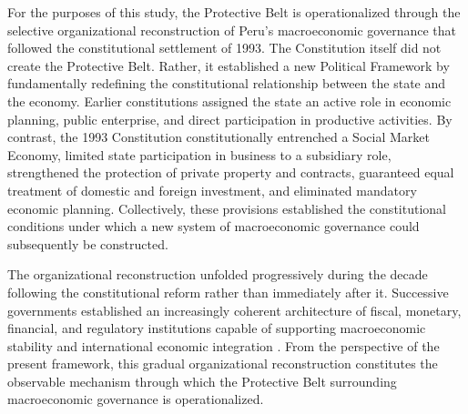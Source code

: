 \documentclass[doc, 12pt, a4paper,floatsintext]{apa7}
\begin{document}
For the purposes of this study, the Protective Belt is operationalized through the selective organizational reconstruction of Peru's macroeconomic governance that followed the constitutional settlement of 1993. The Constitution itself did not create the Protective Belt. Rather, it established a new Political Framework by fundamentally redefining the constitutional relationship between the state and the economy. Earlier constitutions assigned the state an active role in economic planning, public enterprise, and direct participation in productive activities. By contrast, the 1993 Constitution constitutionally entrenched a Social Market Economy, limited state participation in business to a subsidiary role, strengthened the protection of private property and contracts, guaranteed equal treatment of domestic and foreign investment, and eliminated mandatory economic planning. Collectively, these provisions established the constitutional conditions under which a new system of macroeconomic governance could subsequently be constructed.


The organizational reconstruction unfolded progressively during the decade following the constitutional reform rather than immediately after it. Successive governments established an increasingly coherent architecture of fiscal, monetary, financial, and regulatory institutions capable of supporting macroeconomic stability and international economic integration \parencite{santos_peru_2015}. From the perspective of the present framework, this gradual organizational reconstruction constitutes the observable mechanism through which the Protective Belt surrounding macroeconomic governance is operationalized.
\end{document}
